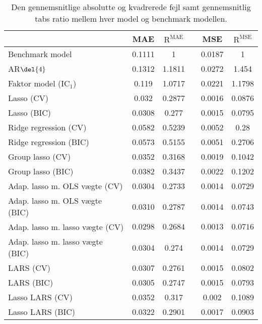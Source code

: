 \begin{table}[ht]
\center
\begin{tabular}{lccccc}
\toprule
 & MAE & \(\text{R}^{\text{MAE}}\) && MSE & \(\text{R}^{\text{MSE}}\) \\ \midrule
 Benchmark model & 0.1111 & 1 && 0.0187 & 1 \\
AR\(\del{4}\) & 0.1312 & 1.1811 && 0.0272 & 1.454 \\  
Faktor model (IC\(_1\)) & 0.119 & 1.0717 && 0.0221 & 1.1798 \\
Lasso (CV) & 0.032 & 0.2877 && 0.0016 & 0.0876 \\
Lasso (BIC) & 0.0308 & 0.277 && 0.0015 & 0.0795 \\
Ridge regression (CV) & 0.0582 & 0.5239 && 0.0052 & 0.28 \\
Ridge regression (BIC) & 0.0573 & 0.5155 && 0.0051 & 0.2706 \\
Group lasso (CV) & 0.0352 & 0.3168 && 0.0019 & 0.1042  \\
Group lasso (BIC) & 0.0382 & 0.3437 && 0.0022 & 0.1202 \\
Adap. lasso m. OLS vægte (CV) & 0.0304 & 0.2733 && 0.0014 & 0.0729 \\
Adap. lasso m. OLS vægte (BIC) & 0.0310 & 0.2787 && 0.0014 & 0.0743 \\
Adap. lasso m. lasso vægte (CV) & $\mathbf{0.0298}$ & $\mathbf{0.2684}$ && $\mathbf{0.0013}$ & $\mathbf{0.0716}$ \\
Adap. lasso m. lasso vægte (BIC) & 0.0304 & 0.274  && 0.0014 & 0.0729 \\
LARS (CV) &  0.0307 & 0.2761 && 0.0015 & 0.0802 \\
LARS (BIC) & 0.0305 & 0.2747 && 0.0015 & 0.0793 \\
Lasso LARS (CV) &  0.0352 & 0.317 && 0.002 & 0.1089 \\
Lasso LARS (BIC) & 0.0322 & 0.2901 && 0.0017 & 0.0903 \\ \bottomrule
\end{tabular}
\caption{Den gennemsnitlige absolutte og kvadrerede fejl samt gennemsnitlig tabs ratio mellem hver model og benchmark modellen.} \label{tab:mae_mse_vurdering}
\end{table}
